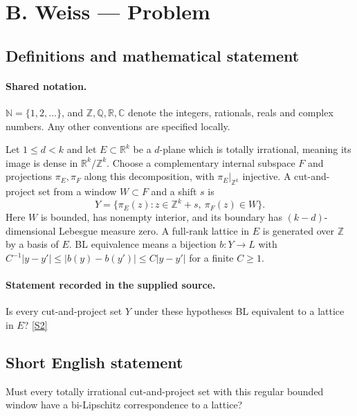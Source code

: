 \documentclass[11pt]{article}
\newcommand{\sref}[2]{\hyperlink{source:#1:#2}{[S#2]}}
\begin{document}
\section{B. Weiss — Problem}\label{statement}

\subsection{Definitions and mathematical statement}

\paragraph{Shared notation.}$\mathbb N=\{1,2,\ldots\}$, and $\mathbb Z,\mathbb Q,\mathbb R,\mathbb C$ denote the integers, rationals, reals and complex numbers. Any other conventions are specified locally.


Let $1\leq d<k$ and let $E\subset\mathbb R^k$ be a $d$-plane which is totally irrational, meaning its image is dense in $\mathbb R^k/\mathbb Z^k$. Choose a complementary internal subspace $F$ and projections $\pi_E,\pi_F$ along this decomposition, with $\pi_E|_{\mathbb Z^k}$ injective. A cut-and-project set from a window $W\subset F$ and a shift $s$ is
\[Y=\{\pi_E(z):z\in\mathbb Z^k+s,\ \pi_F(z)\in W\}.\]
Here $W$ is bounded, has nonempty interior, and its boundary has $(k-d)$-dimensional Lebesgue measure zero. A full-rank lattice in $E$ is generated over $\mathbb Z$ by a basis of $E$. BL equivalence means a bijection $b:Y\to L$ with $C^{-1}|y-y'|\leq|b(y)-b(y')|\leq C|y-y'|$ for a finite $C\geq1$.
\paragraph{Statement recorded in the supplied source.}
Is every cut-and-project set $Y$ under these hypotheses BL equivalent to a lattice in $E$? \sref{statement}{2}
\subsection{Short English statement}
Must every totally irrational cut-and-project set with this regular bounded window have a bi-Lipschitz correspondence to a lattice?
\end{document}

